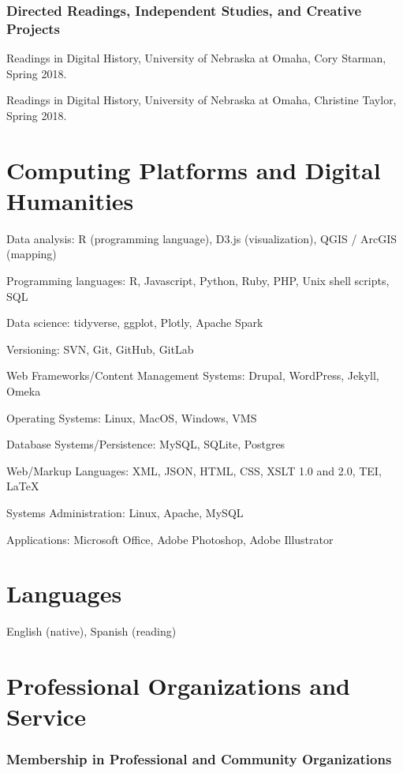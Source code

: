 \subsubsection{Directed Readings, Independent Studies, and Creative
Projects}\label{directed-readings-independent-studies-and-creative-projects}

Readings in Digital History, University of Nebraska at Omaha, Cory
Starman, Spring 2018.

Readings in Digital History, University of Nebraska at Omaha, Christine
Taylor, Spring 2018.

\section{Computing Platforms and Digital
Humanities}\label{computing-platforms-and-digital-humanities}

Data analysis: R (programming language), D3.js (visualization), QGIS /
ArcGIS (mapping)

Programming languages: R, Javascript, Python, Ruby, PHP, Unix shell
scripts, SQL

Data science: tidyverse, ggplot, Plotly, Apache Spark

Versioning: SVN, Git, GitHub, GitLab

Web Frameworks/Content Management Systems: Drupal, WordPress, Jekyll,
Omeka

Operating Systems: Linux, MacOS, Windows, VMS

Database Systems/Persistence: MySQL, SQLite, Postgres

Web/Markup Languages: XML, JSON, HTML, CSS, XSLT 1.0 and 2.0, TEI,
\LaTeX

Systems Administration: Linux, Apache, MySQL

Applications: Microsoft Office, Adobe Photoshop, Adobe Illustrator

\section{Languages}\label{languages}

English (native), Spanish (reading)

\section{Professional Organizations and
Service}\label{professional-organizations-and-service}

\subsubsection{Membership in Professional and Community
Organizations}\label{membership-in-professional-and-community-organizations}

